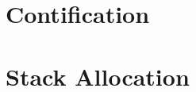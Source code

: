 \documentclass{article}
\begin{document}


\section{Contification}
\label{sec:contification}

\section{Stack Allocation}
\label{sec:stack-alloc}

\end{document}
